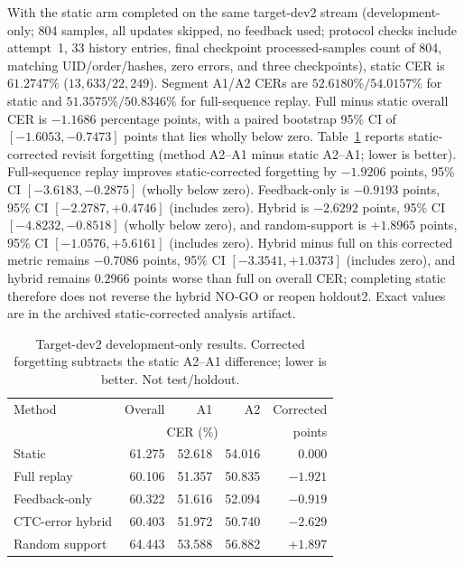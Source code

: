 With the static arm completed on the same target-dev2 stream (development-only; 804 samples, all updates skipped, no feedback used; protocol checks include attempt~1, 33 history entries, final checkpoint processed-samples count of 804, matching UID/order/hashes, zero errors, and three checkpoints), static CER is $61.2747\%$ ($13{,}633/22{,}249$). Segment A1/A2 CERs are $52.6180\%/54.0157\%$ for static and $51.3575\%/50.8346\%$ for full-sequence replay. Full minus static overall CER is $-1.1686$ percentage points, with a paired bootstrap 95\% CI of $[-1.6053,-0.7473]$ points that lies wholly below zero. Table~\ref{tab:dev2_static_corrected} reports static-corrected revisit forgetting (method A2--A1 minus static A2--A1; lower is better). Full-sequence replay improves static-corrected forgetting by $-1.9206$ points, 95\% CI $[-3.6183,-0.2875]$ (wholly below zero). Feedback-only is $-0.9193$ points, 95\% CI $[-2.2787,+0.4746]$ (includes zero). Hybrid is $-2.6292$ points, 95\% CI $[-4.8232,-0.8518]$ (wholly below zero), and random-support is $+1.8965$ points, 95\% CI $[-1.0576,+5.6161]$ (includes zero). Hybrid minus full on this corrected metric remains $-0.7086$ points, 95\% CI $[-3.3541,+1.0373]$ (includes zero), and hybrid remains $0.2966$ points worse than full on overall CER; completing static therefore does not reverse the hybrid NO-GO or reopen holdout2. Exact values are in the archived static-corrected analysis artifact.

\begin{table}[t]
\centering
\caption{Target-dev2 development-only results. Corrected forgetting subtracts the static A2--A1 difference; lower is better. Not test/holdout.}
\label{tab:dev2_static_corrected}
\begin{tabular}{lrrrr}
\toprule
Method & Overall & A1 & A2 & Corrected \\
 & \multicolumn{3}{c}{CER (\%)} & points \\
\midrule
Static & 61.275 & 52.618 & 54.016 & 0.000 \\
Full replay & 60.106 & 51.357 & 50.835 & $-1.921$ \\
Feedback-only & 60.322 & 51.616 & 52.094 & $-0.919$ \\
CTC-error hybrid & 60.403 & 51.972 & 50.740 & $-2.629$ \\
Random support & 64.443 & 53.588 & 56.882 & $+1.897$ \\
\bottomrule
\end{tabular}
\end{table}


